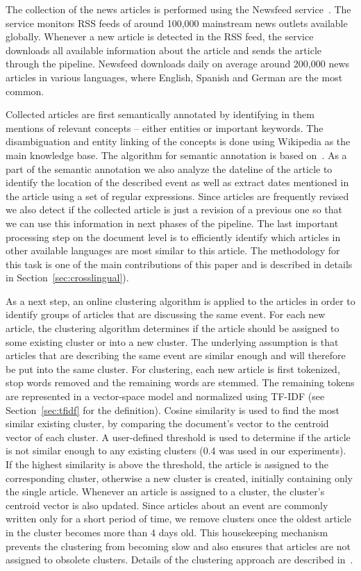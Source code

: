 \documentclass[twoside,11pt]{article}
\begin{document}
The collection of the news articles is performed using the Newsfeed service~\cite{Trampus2012}. The service monitors RSS feeds of around 100,000 mainstream news outlets available globally. Whenever a new article is detected in the RSS feed, the service downloads all available information about the article and sends the article through the pipeline. Newsfeed downloads daily on average around 200,000 news articles in various languages, where English, Spanish and German are the most common.

Collected articles are first semantically annotated by identifying in them mentions of relevant concepts -- either entities or important keywords. The disambiguation and entity linking of the concepts is done using Wikipedia as the main knowledge base. The algorithm for semantic annotation is based on~\cite{zhang2014saaacamactat}. As a part of the semantic annotation we also analyze the dateline of the article to identify the location of the described event as well as extract dates mentioned in the article using a set of regular expressions. Since articles are frequently revised we also detect if the collected article is just a revision of a previous one so that we can use this information in next phases of the pipeline. The last important processing step on the document level is to efficiently identify which articles in other available languages are most similar to this article. The methodology for this task is one of the main contributions of this paper and is described in details in Section~\ref{sec:crosslingual}).

As a next step, an online clustering algorithm is applied to the articles in order to identify groups of articles that are discussing the same event. For each new article, the clustering algorithm determines if the article should be assigned to some existing cluster or into a new cluster. The underlying assumption is that articles that are describing the same event are similar enough and will therefore be put into the same cluster. For clustering, each new article is first tokenized, stop words removed and the remaining words are stemmed.
The remaining tokens are represented in a vector-space model and normalized using TF-IDF (see Section~\ref{sec:tfidf} for the definition). Cosine similarity is used to find the most similar existing cluster, by comparing the document's vector to the centroid vector of each cluster. A user-defined threshold is used to determine if the article is not similar enough to any existing clusters (0.4 was used in our experiments).  If the highest similarity is above the threshold, the article is assigned to the corresponding cluster, otherwise a new cluster is created, initially containing only the single article. Whenever an article is assigned to a cluster, the cluster's centroid vector is also updated. Since articles about an event are commonly written only for a short period of time, we remove clusters once the oldest article in the cluster becomes more than 4 days old. This housekeeping mechanism prevents the clustering from becoming slow and also ensures that articles are not assigned to obsolete clusters. Details of the clustering approach are described in~\cite{brank2014}.
\end{document}
